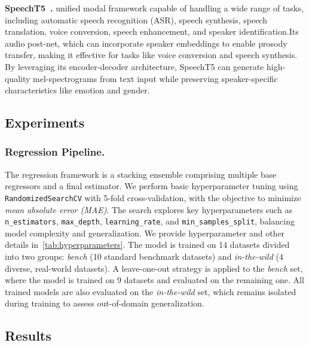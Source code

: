 \noindent\textbf{SpeechT5~\cite{ao2022speecht5unifiedmodalencoderdecoderpretraining}.}
unified modal framework capable of handling a wide range of tasks, including automatic speech recognition (ASR), speech synthesis, speech translation, voice conversion, speech enhancement, and speaker identification.Its audio post-net, which can incorporate speaker embeddings to enable prosody transfer, making it effective for tasks like voice conversion and speech synthesis. By leveraging its encoder-decoder architecture, SpeechT5 can generate high-quality mel-spectrograms from text input while preserving speaker-specific characteristics like emotion and gender.




\subsection{Experiments}\label{appsubsec:experiments}

\subsubsection{Regression Pipeline.}\label{appsubsubsec:regression_pipeline}
The regression framework is a stacking ensemble comprising multiple base regressors and a final estimator. We perform basic hyperparameter tuning using \texttt{RandomizedSearchCV} with 5-fold cross-validation, with the objective to minimize \textit{mean absolute error (MAE)}. The search explores key hyperparameters such as \texttt{n\_estimators}, \texttt{max\_depth}, \texttt{learning\_rate}, and \texttt{min\_samples\_split}, balancing model complexity and generalization. We provide hyperparameter and other details in~\ref{tab:hyperparameters}. The model is trained on 14 datasets divided into two groups: \textit{bench} (10 standard benchmark datasets) and \textit{in-the-wild} (4 diverse, real-world datasets). A leave-one-out strategy is applied to the \textit{bench} set, where the model is trained on 9 datasets and evaluated on the remaining one. All trained models are also evaluated on the \textit{in-the-wild} set, which remains isolated during training to assess out-of-domain generalization.


\subsection{Results}\label{appsubsec:results}




